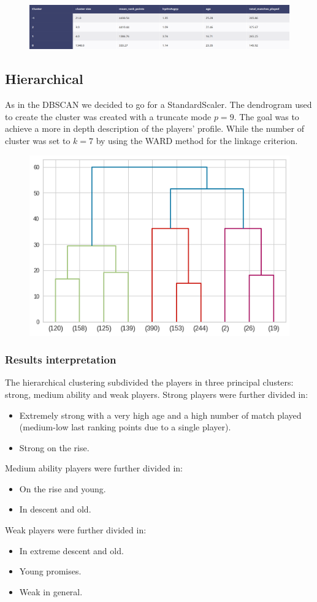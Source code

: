 \documentclass{article}
\begin{document}
\begin{figure}[h]
\centering
\includegraphics[width=.6\textwidth]{dbscan_results}
\label{fig:dbscan_results}
\end{figure}

\subsection{Hierarchical}
As in the DBSCAN we decided to go for a StandardScaler. The dendrogram used to create the cluster was created with a truncate mode $p=9$. The goal was to achieve a more in depth description of the players' profile. While the number of cluster was set to $k=7$ by using the WARD method for the linkage criterion.

\begin{figure}[h]
\centering
\includegraphics[width=.6\textwidth]{hierarchical_dendrogram}
\label{fig:hierarchical_dendrogram}
\end{figure}

\subsubsection{Results interpretation}
The hierarchical clustering subdivided the players in three principal clusters: strong, medium ability and weak players. Strong players were further divided in:
\begin{itemize}
    \item Extremely strong with a very high age and a high number of match played (medium-low last ranking points due to a single player).
    \item Strong on the rise. 
\end{itemize}
Medium ability players were further divided in:
\begin{itemize}
    \item On the rise and young.
    \item In descent and old. 
\end{itemize}
Weak players were further divided in:
\begin{itemize}
    \item In extreme descent and old.
    \item Young promises.
    \item Weak in general.
\end{itemize}
	
\end{document}
